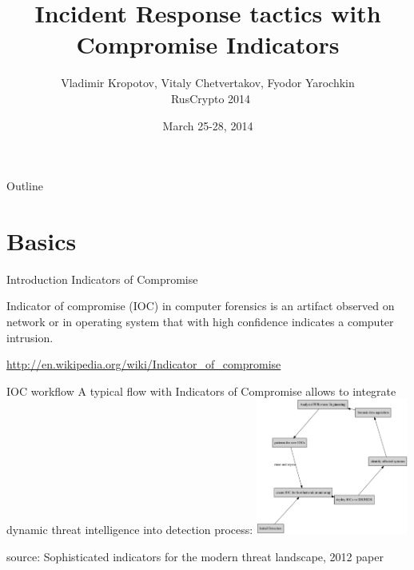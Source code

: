 \documentclass[presentation,smaller]{beamer}
\institute{Affilations:  Academia Sinica, o0o.nu, chroot.org}
\author{Vladimir Kropotov, Vitaly Chetvertakov, Fyodor Yarochkin\\\ RusCrypto 2014}
\date{March 25-28, 2014}
\title{Incident Response tactics with Compromise Indicators}
\begin{document}
\maketitle
\begin{frame}{Outline}
\tableofcontents
\end{frame}



\section{Basics}
\label{sec-1}
\begin{frame}[label=sec-1-1]{Introduction}
\alert{Indicators of Compromise}

Indicator of compromise (IOC) in computer forensics is an artifact
observed on network or in operating system that with high confidence
indicates a computer intrusion.

\url{http://en.wikipedia.org/wiki/Indicator_of_compromise}
\end{frame}


\begin{frame}[label=sec-1-2]{IOC workflow}
A typical flow with Indicators of Compromise allows
to integrate dynamic threat intelligence into detection 
process:
\includegraphics[width=5cm]{images/ioc.png}

source: Sophisticated indicators for the modern threat landscape, 2012
paper
\end{frame}
\end{document}
